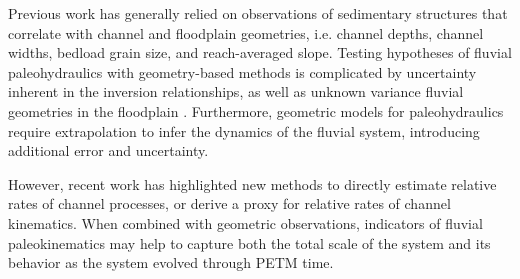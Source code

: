 \documentclass[draft]{compact_proposal}\usepackage[]{graphicx}\usepackage[]{color}
\begin{document}



Previous work has generally relied on observations of sedimentary structures that correlate with channel and floodplain geometries, i.e. channel depths, channel widths, bedload grain size, and reach-averaged slope.
Testing hypotheses of fluvial paleohydraulics with geometry-based methods is complicated by uncertainty inherent in the inversion relationships, as well as unknown variance fluvial geometries in the floodplain .
Furthermore, geometric models for paleohydraulics require extrapolation to infer the dynamics of the fluvial system, introducing additional error and uncertainty.

However, recent work has highlighted new methods to directly estimate relative rates of channel processes, or derive a proxy for relative rates of channel kinematics.
When combined with geometric observations, indicators of fluvial paleokinematics may help to capture both the total scale of the system and its behavior as the system evolved through PETM time.
\end{document}
